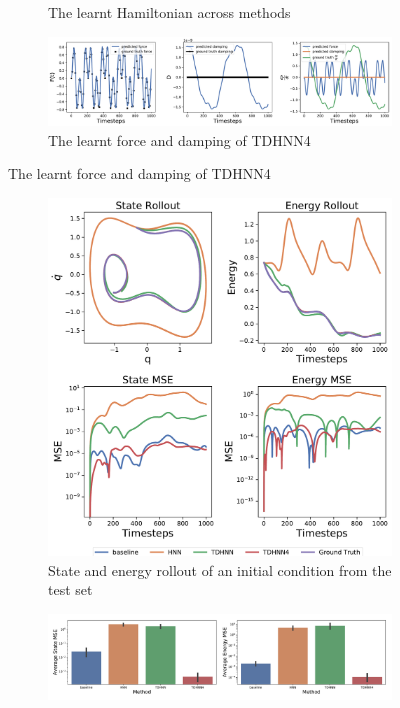 \documentclass[twoside]{article}
\begin{document}
\begin{figure}[!htb]
\begin{subfigure}[b]{0.48\textwidth}
\caption{The learnt Hamiltonian across methods}
\end{subfigure}
\begin{subfigure}[b]{0.48\textwidth}
\includegraphics[width=\textwidth]{figures/figures/forced_mass_spring/2/forced_mass_spring_dpdt_0.pdf}
\caption{The learnt force and damping of TDHNN4}
\end{subfigure}
\label{forced_mpsring_2_full}
\end{figure}
\begin{figure}[!htb]
\centering
\captionsetup{justification=centering}
\begin{subfigure}[b]{0.48\textwidth}
\includegraphics[width=\textwidth]{figures/figures/duffing/1/duffing_long_0.pdf}
\caption{State and energy rollout of an initial condition from the test set}
\end{subfigure}
\begin{subfigure}[b]{0.48\textwidth}
\includegraphics[width=\textwidth]{figures/figures/duffing/1/duffing_errors_0.pdf}

\end{subfigure}
\end{figure}
\end{document}
